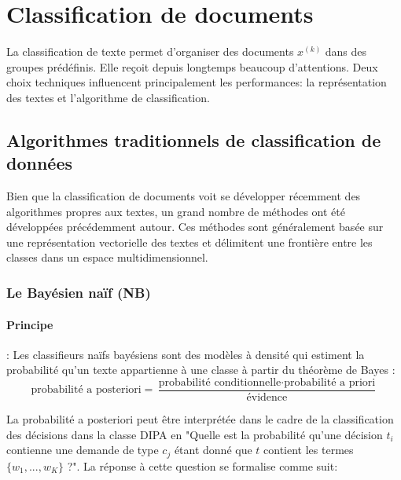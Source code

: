 \section{Classification de documents}
\label{sec:sensresultat:biblio_classif}

La classification de texte permet d'organiser des documents $x^{(k)}$ dans des groupes prédéfinis. Elle reçoit depuis longtemps beaucoup d'attentions. Deux choix techniques influencent principalement les performances: la représentation des textes et l'algorithme de classification. 

\subsection{Algorithmes traditionnels de classification de données}
Bien que la classification de documents voit se développer récemment des algorithmes propres aux textes, un grand nombre de méthodes ont été développées précédemment autour. Ces méthodes sont généralement basée sur une représentation vectorielle des textes et délimitent une frontière entre les classes dans un espace multidimensionnel. 

\subsubsection{Le Bayésien naïf (NB)}
\paragraph{Principe}:
Les classifieurs naïfs bayésiens \citep{duda1973patternclass} sont des modèles à densité qui estiment la probabilité qu'un texte appartienne à une classe à partir du théorème de Bayes \citep{raschka2014naivebayes}:
\begin{equation}
\text{probabilité a posteriori} = \frac{\text{probabilité conditionnelle} \cdot \text{probabilité a priori}}{\text{évidence}}
\end{equation}

La probabilité a posteriori peut être interprétée dans le cadre de la classification des décisions dans la classe DIPA en "Quelle est la probabilité qu'une décision $t_i$ contienne une demande de type $c_j$ étant donné que $t$ contient les termes $\lbrace w_1, ..., w_K \rbrace$ ?". La réponse à cette question se formalise comme suit:

